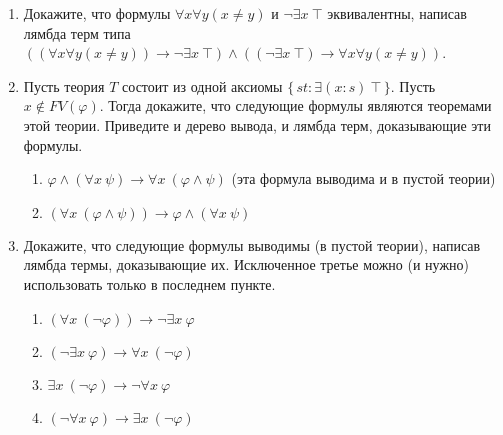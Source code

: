 \begin{enumerate}
\item Докажите, что формулы $\forall x \forall y (x \neq y)$ и $\neg \exists x\ \top$ эквивалентны,
    написав лямбда терм типа $((\forall x \forall y (x \neq y)) \to \neg \exists x\ \top) \land ((\neg \exists x\ \top) \to \forall x \forall y (x \neq y))$.

\item Пусть теория $T$ состоит из одной аксиомы $\{\,st : \exists (x : s)\ \top\,\}$.
    Пусть $x \notin FV(\varphi)$.
    Тогда докажите, что следующие формулы являются теоремами этой теории.
    Приведите и дерево вывода, и лямбда терм, доказывающие эти формулы.
\begin{enumerate}
\item $\varphi \land (\forall x\ \psi) \to \forall x\ (\varphi \land \psi)$ (эта формула выводима и в пустой теории)
\item $(\forall x\ (\varphi \land \psi)) \to \varphi \land (\forall x\ \psi)$
\end{enumerate}

\item Докажите, что следующие формулы выводимы (в пустой теории), написав лямбда термы, доказывающие их.
    Исключенное третье можно (и нужно) использовать только в последнем пункте.
\begin{enumerate}
\item $(\forall x\ (\neg \varphi)) \to \neg \exists x\ \varphi$
\item $(\neg \exists x\ \varphi) \to \forall x\ (\neg \varphi)$
\item $\exists x\ (\neg \varphi) \to \neg \forall x\ \varphi$
\item $(\neg \forall x\ \varphi) \to \exists x\ (\neg \varphi)$
\end{enumerate}

\end{enumerate}

